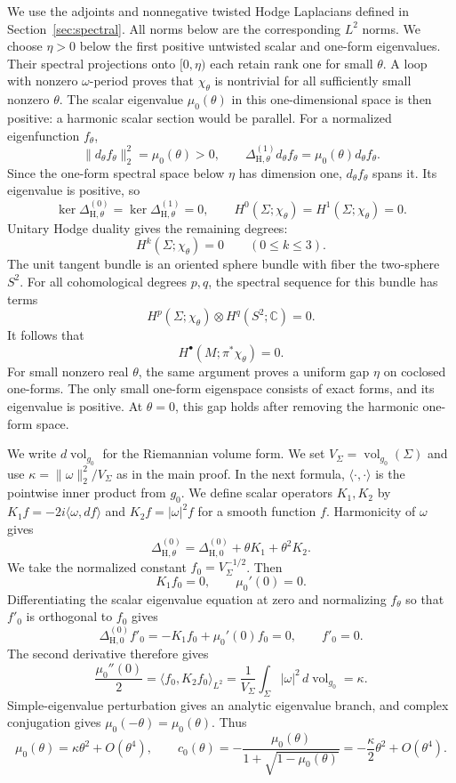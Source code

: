 \documentclass[11pt,letterpaper,reqno]{amsart}
\theoremstyle{remark}
\begin{document}
We use the adjoints and nonnegative twisted Hodge Laplacians defined
in Section~\ref{sec:spectral}.
All norms below are the corresponding $L^2$ norms.
We choose $\eta>0$ below the first positive untwisted scalar and
one-form eigenvalues.
Their spectral projections onto $[0,\eta)$ each retain rank one
for small $\theta$.
A loop with nonzero $\omega$-period proves that $\chi_\theta$ is
nontrivial for all sufficiently small nonzero $\theta$.
The scalar eigenvalue $\mu_0(\theta)$ in this one-dimensional space is then positive:
a harmonic scalar section would be parallel.
For a normalized eigenfunction $f_\theta$,
\[
 \|d_\theta f_\theta\|_2^2=\mu_0(\theta)>0,\qquad
 \Delta_{\mathrm H,\theta}^{(1)}d_\theta f_\theta
   =\mu_0(\theta)d_\theta f_\theta.
\]
Since the one-form spectral space below $\eta$ has dimension one,
$d_\theta f_\theta$ spans it. Its eigenvalue is positive, so
\[
 \ker\Delta_{\mathrm H,\theta}^{(0)}
 =\ker\Delta_{\mathrm H,\theta}^{(1)}=0,
 \qquad H^0(\Sigma;\chi_\theta)=H^1(\Sigma;\chi_\theta)=0.
\]
Unitary Hodge duality gives the remaining degrees:
\[
 H^k(\Sigma;\chi_\theta)=0\qquad(0\leq k\leq3).
\]
The unit tangent bundle is an oriented sphere bundle with fiber the
two-sphere $S^2$. For all cohomological degrees $p,q$, the spectral
sequence for this bundle has terms
\[
 H^p(\Sigma;\chi_\theta)\otimes H^q(S^2;\mathbb C)=0.
\]
It follows that
\[
 H^\bullet(M;\pi^*\chi_\theta)=0.
\]
For small nonzero real $\theta$, the same argument proves a
uniform gap $\eta$ on coclosed one-forms. The only small one-form
eigenspace consists of exact forms, and its eigenvalue is positive.
At $\theta=0$, this gap holds after removing the harmonic
one-form space.

We write $d\operatorname{vol}_{g_0}$ for the Riemannian volume form.
We set $V_\Sigma=\operatorname{vol}_{g_0}(\Sigma)$ and use
$\kappa=\|\omega\|_2^2/V_\Sigma$ as in the main proof.
In the next formula, $\langle\cdot,\cdot\rangle$ is the pointwise
inner product from $g_0$. We define scalar operators $K_1,K_2$ by
$K_1f=-2i\langle\omega,df\rangle$ and $K_2f=|\omega|^2f$
for a smooth function $f$. Harmonicity of $\omega$ gives
\[
 \Delta_{\mathrm H,\theta}^{(0)}
 =\Delta_{\mathrm H,0}^{(0)}+\theta K_1+\theta^2K_2.
\]
We take the normalized constant $f_0=V_\Sigma^{-1/2}$. Then
\[
 K_1f_0=0,\qquad\mu_0'(0)=0.
\]
Differentiating the scalar eigenvalue equation at zero and normalizing
$f_\theta$ so that $f'_0$ is orthogonal to $f_0$ gives
\[
 \Delta_{\mathrm H,0}^{(0)}f'_0=-K_1f_0+\mu_0'(0)f_0=0,
 \qquad f'_0=0.
\]
The second derivative therefore gives
\[
 \frac{\mu_0''(0)}2
 =\langle f_0,K_2f_0\rangle_{L^2}
 =\frac1{V_\Sigma}\int_\Sigma|\omega|^2\,d\operatorname{vol}_{g_0}
 =\kappa.
\]
Simple-eigenvalue perturbation gives an analytic eigenvalue branch,
and complex conjugation gives $\mu_0(-\theta)=\mu_0(\theta)$. Thus
\begin{equation}\label{app:scalarquadratic}
 \mu_0(\theta)=\kappa\theta^2+O(\theta^4),\qquad
 c_0(\theta)=-\frac{\mu_0(\theta)}{1+\sqrt{1-\mu_0(\theta)}}
 =-\frac\kappa2\theta^2+O(\theta^4).
\end{equation}
\end{document}
